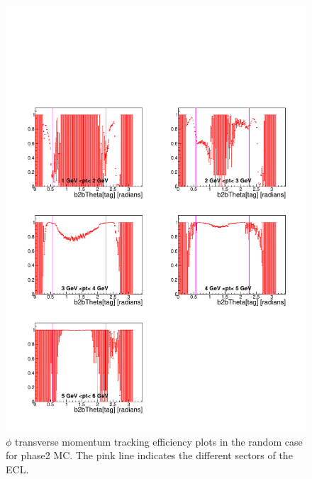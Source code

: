 \documentclass[a4paper,11pt,twosided,final,german,openbib,pdftex,listof=totoc,bibliography=totoc]{scrbook}
\begin{document}
\begin{appendix}
\clearpage
\begin{figure}[!htbp]
	\centering
	\includegraphics[width=\textwidth]{Plots/master/xPtMThetaRandom_MC}
	\caption[Transverse Momentum $\theta$ Random Efficiency Phase2 MC]{$\phi$ transverse momentum tracking efficiency plots in the random case for phase2 MC. The pink line indicates the different sectors of the ECL.}
	\label{plt:PtMThetaRandom_MC}
\end{figure}



\end{appendix}
\end{document}
